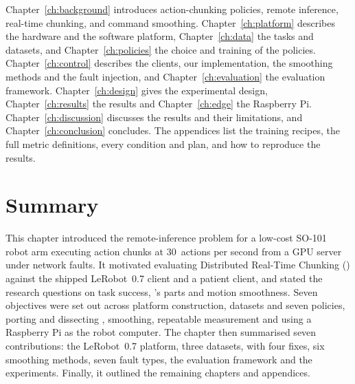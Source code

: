 Chapter~\ref{ch:background} introduces action-chunking policies, remote inference, real-time chunking, \drtc{} and
command smoothing. Chapter~\ref{ch:platform} describes the hardware and the software platform,
Chapter~\ref{ch:data} the tasks and datasets, and Chapter~\ref{ch:policies} the choice and training of the policies.
Chapter~\ref{ch:control} describes the clients, our \drtc{} implementation, the smoothing methods and the fault
injection, and Chapter~\ref{ch:evaluation} the evaluation framework. Chapter~\ref{ch:design} gives the experimental
design, Chapter~\ref{ch:results} the results and Chapter~\ref{ch:edge} the Raspberry Pi. Chapter~\ref{ch:discussion}
discusses the results and their limitations, and Chapter~\ref{ch:conclusion} concludes. The appendices list the training
recipes, the full metric definitions, every condition and plan, and how to reproduce the results.

\section{Summary}
This chapter introduced the remote-inference problem for a low-cost SO-101 robot arm executing action chunks at 30~actions per second from a GPU server under network faults. It motivated evaluating Distributed Real-Time Chunking (\drtc{}) against the shipped LeRobot~0.7 client and a patient client, and stated the research questions on task success, \drtc{}'s parts and motion smoothness. Seven objectives were set out across platform construction, datasets and seven policies, porting and dissecting \drtc{}, smoothing, repeatable measurement and using a Raspberry Pi as the robot computer. The chapter then summarised seven contributions: the LeRobot~0.7 platform, three datasets, \drtc{} with four fixes, six smoothing methods, seven fault types, the evaluation framework and the experiments. Finally, it outlined the remaining chapters and appendices.
